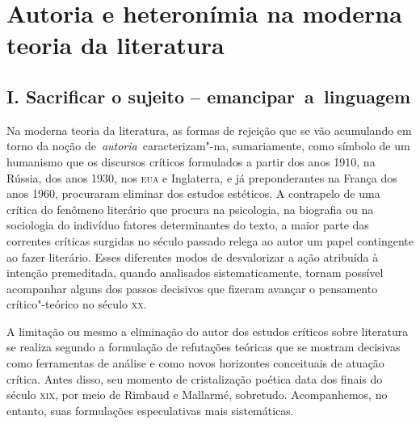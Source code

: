 






\chapter*{Autoria e heteronímia na moderna teoria da literatura}

\section*{I. Sacrificar o sujeito -- emancipar~a~linguagem}


Na moderna teoria da literatura, as formas de rejeição que se vão
acumulando em torno da noção de~\emph{autoria}~caracterizam"-na,
sumariamente, como símbolo de um humanismo que os discursos críticos
formulados a partir dos anos 1910, na Rússia, dos anos 1930, nos
\textsc{eua} e Inglaterra, e já preponderantes na França dos anos 1960,
procuraram eliminar dos estudos estéticos. A contrapelo de uma crítica
do fenômeno literário que procura na psicologia, na biografia ou na
sociologia do indivíduo fatores determinantes do texto, a maior parte
das correntes críticas surgidas no século passado relega ao autor um
papel contingente ao fazer literário. Esses diferentes modos de
desvalorizar a ação atribuída à intenção premeditada, quando analisados
sistematicamente, tornam possível acompanhar alguns dos passos decisivos
que fizeram avançar o pensamento crítico"-teórico no século \textsc{xx}.

A limitação ou mesmo a eliminação do autor dos estudos críticos sobre
literatura se realiza segundo a formulação de refutações teóricas que se
mostram decisivas como ferramentas de análise e como novos horizontes
conceituais de atuação crítica. Antes disso, seu momento de
cristalização poética data dos finais do século \textsc{xix}, por meio
de Rimbaud e Mallarmé, sobretudo. Acompanhemos, no entanto, suas
formulações especulativas mais sistemáticas.

